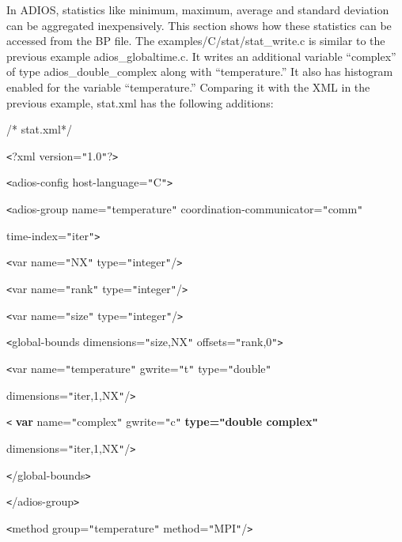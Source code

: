 \parindent=0pt
In ADIOS, statistics like minimum, maximum, average and standard deviation can 
be aggregated inexpensively. This section shows how these statistics can be accessed 
from the BP file. The examples/C/stat/stat\_write.c is similar to the previous 
example adios\_globaltime.c. It writes an additional variable ``complex'' of type 
adios\_double\_complex along with ``temperature.''  It also has histogram enabled 
for the variable ``temperature.''  Comparing it with the XML in the previous example, 
stat.xml has the following additions:

/* stat.xml*/

\texttt{<}?xml version=\texttt{"}1.0\texttt{"}?\texttt{>}

\texttt{<}adios-config host-language=\texttt{"}C\texttt{"}\texttt{>}

\texttt{<}adios-group name=\texttt{"}temperature\texttt{"} coordination-communicator=\texttt{"}comm\texttt{"} 

\leftskip=36pt
\parindent=36pt
time-index=\texttt{"}iter\texttt{"}\texttt{>}

\leftskip=0pt
\parindent=0pt
\texttt{<}var name=\texttt{"}NX\texttt{"} type=\texttt{"}integer\texttt{"}/\texttt{>}

\texttt{<}var name=\texttt{"}rank\texttt{"} type=\texttt{"}integer\texttt{"}/\texttt{>}

\texttt{<}var name=\texttt{"}size\texttt{"} type=\texttt{"}integer\texttt{"}/\texttt{>}

\texttt{<}global-bounds dimensions=\texttt{"}size,NX\texttt{"} offsets=\texttt{"}rank,0\texttt{"}\texttt{>}

\texttt{<}var name=\texttt{"}temperature\texttt{"} gwrite=\texttt{"}t\texttt{"} 
type=\texttt{"}double\texttt{"}

dimensions=\texttt{"}iter,1,NX\texttt{"}/\texttt{>}

\parindent=36pt
{\color{color02} \texttt{<}}{\color{color02} \textbf{var}}{\color{color02}  name=\texttt{"}complex\texttt{"} 
gwrite=\texttt{"}c\texttt{"} }{\color{color02} \textbf{type=\texttt{"}double complex\texttt{"}}}

\parindent=0pt
{\color{color02} dimensions=\texttt{"}iter,1,NX\texttt{"}/\texttt{>}}

\texttt{<}/global-bounds\texttt{>}

\parindent=36pt
\texttt{<}/adios-group\texttt{>}

\parindent=0pt
\texttt{<}method group=\texttt{"}temperature\texttt{"} method=\texttt{"}MPI\texttt{"}/\texttt{>}

